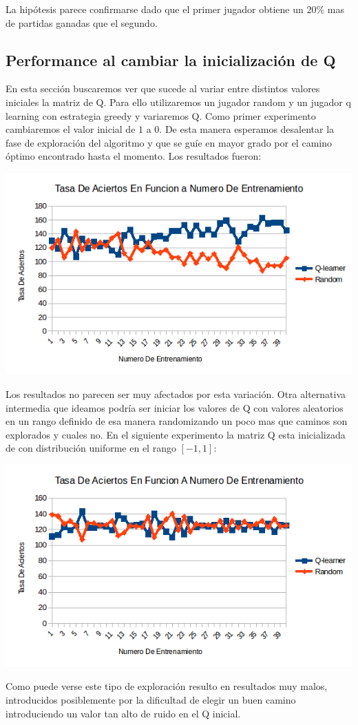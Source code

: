 La hipótesis parece confirmarse dado que el primer jugador obtiene un $20 \%$ mas de partidas ganadas que el segundo.

\subsection{Performance al cambiar la inicialización de Q}

En esta sección buscaremos ver que sucede al variar entre distintos valores iniciales la matriz de Q. Para ello utilizaremos un jugador random y un jugador q learning con estrategia greedy y variaremos Q. Como primer experimento cambiaremos el valor inicial de $1$ a $0$. De esta manera esperamos desalentar la fase de exploración del algoritmo y que se guíe en mayor grado por el camino óptimo encontrado hasta el momento. Los resultados fueron:

\includegraphics[scale=0.5]{testing/variarq.png}

Los resultados no parecen ser muy afectados por esta variación. Otra alternativa intermedia que ideamos podría ser iniciar los valores de Q con valores aleatorios en un rango definido de esa manera randomizando un poco mas que caminos son explorados y cuales no. En el siguiente experimento la matriz Q esta inicializada de con distribución uniforme en el rango $[-1,1]$:

\includegraphics[scale=0.5]{testing/variarq2.png}

Como puede verse este tipo de exploración resulto en resultados muy malos, introducidos posiblemente por la dificultad de elegir un buen camino introduciendo un valor tan alto de ruido en el Q inicial.